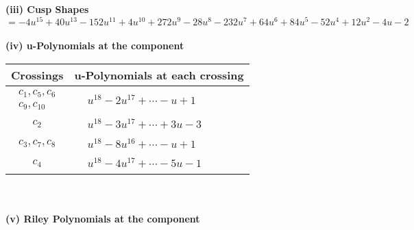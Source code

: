 \documentclass[1p]{elsarticle_modified}
\theoremstyle{definition}
\begin{document}
\flushleft \textbf{(iii) Cusp Shapes $= -4 u^{15}+40 u^{13}-152 u^{11}+4 u^{10}+272 u^9-28 u^8-232 u^7+64 u^6+84 u^5-52 u^4+12 u^2-4 u-2$}\\~\\
\newpage\renewcommand{\arraystretch}{1}
\flushleft \textbf{(iv) u-Polynomials at the component}\newline \\
\begin{tabular}{m{50pt}|m{274pt}}
Crossings & \hspace{64pt}u-Polynomials at each crossing \\
\hline $$\begin{aligned}c_{1},c_{5},c_{6}\\c_{9},c_{10}\end{aligned}$$&$\begin{aligned}
&u^{18}-2 u^{17}+\cdots- u+1
\end{aligned}$\\
\hline $$\begin{aligned}c_{2}\end{aligned}$$&$\begin{aligned}
&u^{18}-3 u^{17}+\cdots+3 u-3
\end{aligned}$\\
\hline $$\begin{aligned}c_{3},c_{7},c_{8}\end{aligned}$$&$\begin{aligned}
&u^{18}-8 u^{16}+\cdots- u+1
\end{aligned}$\\
\hline $$\begin{aligned}c_{4}\end{aligned}$$&$\begin{aligned}
&u^{18}-4 u^{17}+\cdots-5 u-1
\end{aligned}$\\
\hline
\end{tabular}\\~\\
\newpage\renewcommand{\arraystretch}{1}
\flushleft \textbf{(v) Riley Polynomials at the component}\newline \\
\end{document}
